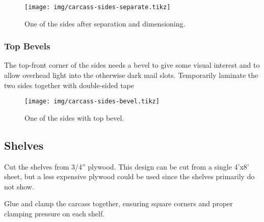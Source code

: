 \begin{figure}[!h]
    \centering
    \texttt{[image: img/carcass-sides-separate.tikz]}
    \caption{One of the sides after separation and dimensioning.\label{fig:carcassside}}
\end{figure}

\subsubsection{Top Bevels}
The top-front corner of the sides needs a bevel to give some visual interest and to allow overhead light into the otherwise dark mail slots. Temporarily laminate the two sides together with double-sided tape  

\begin{figure}[!h]
    \centering
    \texttt{[image: img/carcass-sides-bevel.tikz]}
    \caption{One of the sides with top bevel.\label{fig:carcasbevel}}
\end{figure}

\subsection{Shelves}
Cut the shelves from 3/4'' plywood. This design can be cut from a single 4'x8' sheet, but a less 
expensive plywood could be used since the shelves primarily do not show.

Glue and clamp the carcass together, ensuring square corners and proper clamping pressure on each 
shelf.
